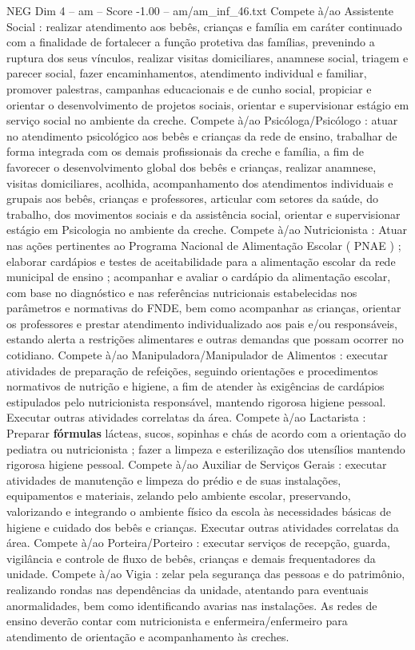 \begin{textsample}{NEG Dim 4 – am – Score -1.00 – am/am\_inf\_46.txt}
Compete à/ao Assistente Social : realizar atendimento aos bebês, crianças e família em caráter continuado com a finalidade de fortalecer a função protetiva das famílias, prevenindo a ruptura dos seus vínculos, realizar visitas domiciliares, anamnese social, triagem e parecer social, fazer encaminhamentos, atendimento individual e familiar, promover palestras, campanhas educacionais e de cunho social, propiciar e orientar o desenvolvimento de projetos sociais, orientar e supervisionar estágio em serviço social no ambiente da creche.
Compete à/ao Psicóloga/Psicólogo : atuar no atendimento psicológico aos bebês e crianças da rede de ensino, trabalhar de forma integrada com os demais profissionais da creche e família, a fim de favorecer o desenvolvimento global dos bebês e crianças, realizar anamnese, visitas domiciliares, acolhida, acompanhamento dos atendimentos individuais e grupais aos bebês, crianças e professores, articular com setores da saúde, do trabalho, dos movimentos sociais e da assistência social, orientar e supervisionar estágio em Psicologia no ambiente da creche.
Compete à/ao Nutricionista : Atuar nas ações pertinentes ao Programa Nacional de Alimentação Escolar ( PNAE ) ; elaborar cardápios e testes de aceitabilidade para a alimentação escolar da rede municipal de ensino ; acompanhar e avaliar o cardápio da alimentação escolar, com base no diagnóstico e nas referências nutricionais estabelecidas nos parâmetros e normativas do FNDE, bem como acompanhar as crianças, orientar os professores e prestar atendimento individualizado aos pais e/ou responsáveis, estando alerta a restrições alimentares e outras demandas que possam ocorrer no cotidiano.
Compete à/ao Manipuladora/Manipulador de Alimentos : executar atividades de preparação de refeições, seguindo orientações e procedimentos normativos de nutrição e higiene, a fim de atender às exigências de cardápios estipulados pelo nutricionista responsável, mantendo rigorosa higiene pessoal.
Executar outras atividades correlatas da área.
Compete à/ao Lactarista : Preparar \textbf{fórmulas} lácteas, sucos, sopinhas e chás de acordo com a orientação do pediatra ou nutricionista ; fazer a limpeza e esterilização dos utensílios mantendo rigorosa higiene pessoal.
Compete à/ao Auxiliar de Serviços Gerais : executar atividades de manutenção e limpeza do prédio e de suas instalações, equipamentos e materiais, zelando pelo ambiente escolar, preservando, valorizando e integrando o ambiente físico da escola às necessidades básicas de higiene e cuidado dos bebês e crianças.
Executar outras atividades correlatas da área.
Compete à/ao Porteira/Porteiro : executar serviços de recepção, guarda, vigilância e controle de fluxo de bebês, crianças e demais frequentadores da unidade.
Compete à/ao Vigia : zelar pela segurança das pessoas e do patrimônio, realizando rondas nas dependências da unidade, atentando para eventuais anormalidades, bem como identificando avarias nas instalações.
As redes de ensino deverão contar com nutricionista e enfermeira/enfermeiro para atendimento de orientação e acompanhamento às creches.

\end{textsample}
